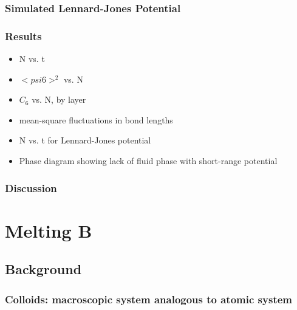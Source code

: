 \documentclass[11pt]{article}
\begin{document}
\subsubsection{Simulated Lennard-Jones Potential}
\label{sec-2.3.5}

\subsubsection{Results}
\label{sec-2.3.6}

\begin{itemize}

\item N vs. t\\
\label{sec-2.3.6.1}


\item $< psi6 >^2$ vs. N\\
\label{sec-2.3.6.2}


\item $C_6$ vs. N, by layer\\
\label{sec-2.3.6.3}


\item mean-square fluctuations in bond lengths\\
\label{sec-2.3.6.4}


\item N vs. t for Lennard-Jones potential\\
\label{sec-2.3.6.5}


\item Phase diagram showing lack of fluid phase with short-range potential\\
\label{sec-2.3.6.6}

\end{itemize} %
\subsubsection{Discussion}
\label{sec-2.3.7}

\section{Melting B}
\label{sec-3}

\subsection{Background}
\label{sec-3.1}

\subsubsection{Colloids: macroscopic system analogous to atomic system}
\label{sec-3.1.1}
\end{document}
